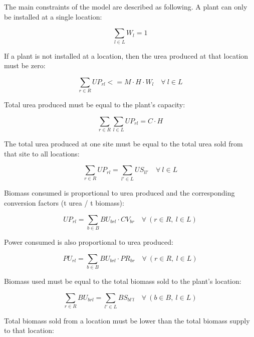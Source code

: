 \documentclass[a4paper, titlepage]{article}
\begin{document}
The main constraints of the model are described as following. A plant can only be installed at a single location:

\begin{equation}
    \sum_{l \in L} W_l = 1
\end{equation}

If a plant is not installed at a location, then the urea produced at that location must be zero:

\begin{equation}
    \sum_{r \in R} UP_{rl} <= M \cdot H \cdot W_l \quad \forall \ l \in L
\end{equation}

Total urea produced must be equal to the plant's capacity:

\begin{equation}
    \sum_{r \in R} \sum_{l \in L} UP_{rl} = C \cdot H
\end{equation}

The total urea produced at one site must be equal to the total urea sold from that site to all locations:

\begin{equation}
    \sum_{r \in R} UP_{rl} = \sum_{l' \in L} US_{ll'} \quad \forall \ l \in L
\end{equation}

Biomass consumed is proportional to urea produced and the corresponding conversion factors (t urea / t biomass):

\begin{equation}
    UP_{rl} = \sum_{b \in B} BU_{brl} \cdot CV_{br} \quad \forall \ (r \in R, \ l \in L)
\end{equation}

Power consumed is also proportional to urea produced:

\begin{equation}
    PU_{rl} = \sum_{b \in B} BU_{brl} \cdot PR_{br} \quad \forall \ (r \in R, \ l \in L)
\end{equation}

Biomass used must be equal to the total biomass sold to the plant's location:

\begin{equation}
    \sum_{r \in R} BU_{brl} = \sum_{l' \in L} BS_{bl'l} \quad \forall \ (b \in B, \ l \in L)
\end{equation}

Total biomass sold from a location must be lower than the total biomass supply to that location:
\end{document}
